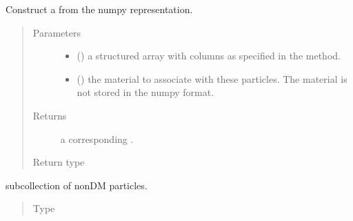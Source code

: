 \documentclass[letterpaper,10pt,english]{sphinxmanual}
\begin{document}
\begin{fulllineitems}
\begin{fulllineitems}
\begin{quote}
\begin{description}
\end{description}\end{quote}

\end{fulllineitems}


\begin{fulllineitems}
\label{\detokenize{code_structure:scdc.particle.ParticleCollection.from_npy}}
Construct a  from the numpy representation.
\begin{quote}\begin{description}
\item[{Parameters}] \leavevmode\begin{itemize}
\item {} 
 () \textendash{} a structured array with columns as specified
in the  method.

\item {} 
 () \textendash{} the material to associate with these
particles. The material is not stored in the numpy format.

\end{itemize}

\item[{Returns}] \leavevmode
a corresponding .

\item[{Return type}] \leavevmode
{\hyperref[\detokenize{code_structure:scdc.particle.ParticleCollection}]{}}

\end{description}\end{quote}

\end{fulllineitems}


\begin{fulllineitems}
\label{\detokenize{code_structure:scdc.particle.ParticleCollection.nondark}}
subcollection of non\sphinxhyphen{}DM particles.
\begin{quote}\begin{description}
\item[{Type}] \leavevmode
{\hyperref[\detokenize{code_structure:scdc.particle.ParticleCollection}]{}}


\end{description}
\end{quote}
\end{fulllineitems}
\end{fulllineitems}
\end{document}

